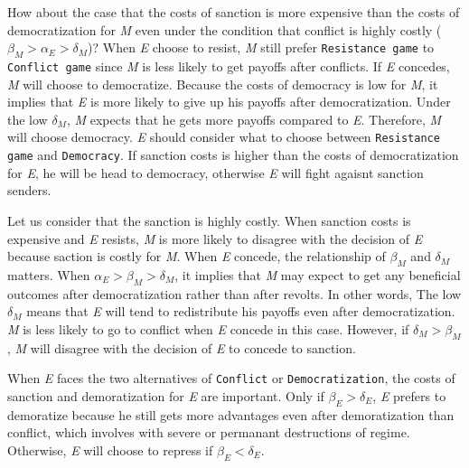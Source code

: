 \documentclass[11pt]{article}
\begin{document}
How about the case that the costs of sanction is more expensive than the costs of democratization for \textit{M} even under the condition that conflict is highly costly ($\beta_{M} > \alpha_{E} > \delta_{M}$)? When \textit{E} choose to resist, \textit{M} still prefer \texttt{Resistance game} to \texttt{Conflict game} since \textit{M} is less likely to get payoffs after conflicts. If \textit{E} concedes, \textit{M} will choose to democratize. Because the costs of democracy is low for \textit{M}, it implies that \textit{E} is more likely to give up his payoffs after democratization. Under the low $\delta_{M}$, \textit{M} expects that he gets more payoffs compared to \textit{E}. Therefore, \textit{M} will choose democracy. \textit{E} should consider what to choose between \texttt{Resistance game} and \texttt{Democracy}. If sanction costs is higher than the costs of democratization for \textit{E}, he will be head to democracy, otherwise \textit{E} will fight agaisnt sanction senders.


Let us consider that the sanction is highly costly. When sanction costs is expensive and \textit{E} resists, \textit{M} is more likely to disagree with the decision of \textit{E} because saction is costly for \textit{M}. When \textit{E} concede, the relationship of $\beta_{M}$ and $\delta_{M}$ matters. When $\alpha_{E} > \beta_{M} > \delta_{M}$, it implies that \textit{M} may expect to get any beneficial outcomes after democratization rather than after revolts. In other words, The low $\delta_{M}$ means that \textit{E} will tend to redistribute his payoffs even after democratization. \textit{M} is less likely to go to conflict when \textit{E} concede in this case. However, if $\delta_{M} > \beta_{M}$, \textit{M} will disagree with the decision of \textit{E} to concede to sanction.

When \textit{E} faces the two alternatives of \texttt{Conflict} or \texttt{Democratization}, the costs of sanction and demoratization for \textit{E} are important. Only if $\beta_{E} > \delta_{E}$, \textit{E} prefers to demoratize because he  still gets more advantages even after demoratization than conflict, which involves with severe or permanant destructions of regime. Otherwise, \textit{E} will choose to repress if $\beta_{E} < \delta_{E}$.
\end{document}
